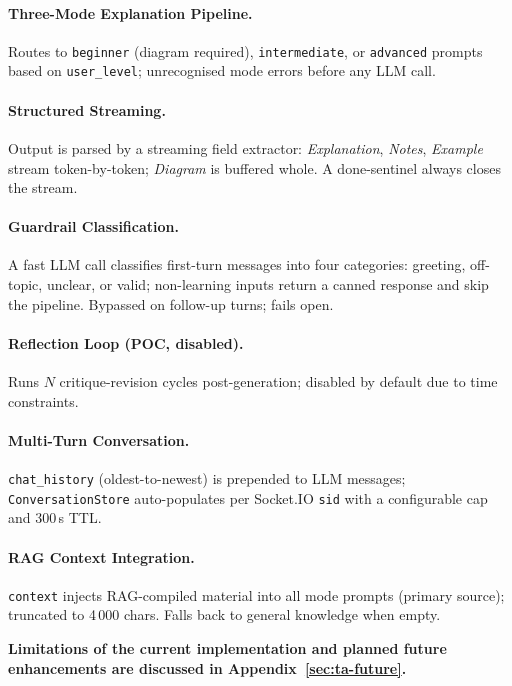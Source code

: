 \documentclass{ecai}
\begin{document}
\paragraph{Three-Mode Explanation Pipeline.}
Routes to \texttt{beginner} (diagram required), \texttt{intermediate}, or 
\texttt{advanced} prompts based on \texttt{user\_level}; unrecognised mode 
errors before any LLM call.

\paragraph{Structured Streaming.}
Output is parsed by a streaming field extractor: \textit{Explanation}, 
\textit{Notes}, \textit{Example} stream token-by-token; \textit{Diagram} is 
buffered whole. A done-sentinel always closes the stream.

\paragraph{Guardrail Classification.}
A fast LLM call classifies first-turn messages into four categories: greeting,
 off-topic, unclear, or valid; non-learning inputs return a canned response and
  skip the pipeline. Bypassed on follow-up turns; fails open.

\paragraph{Reflection Loop (POC, disabled).}
Runs $N$ critique-revision cycles post-generation; disabled by default due to
 time constraints.

\paragraph{Multi-Turn Conversation.}
\texttt{chat\_history} (oldest-to-newest) is prepended to LLM messages; 
\texttt{ConversationStore} auto-populates per Socket.IO \texttt{sid} with a 
configurable cap and 300\,s TTL.

\paragraph{RAG Context Integration.}
\texttt{context} injects RAG-compiled material into all mode prompts 
(primary source); truncated to 4\,000 chars. Falls back to general knowledge 
when empty.

\vspace{\baselineskip}
\noindent\textbf{Limitations of the current implementation and planned future 
enhancements are discussed in Appendix~\ref{sec:ta-future}.}
\end{document}

